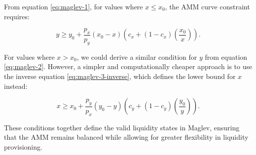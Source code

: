 \documentclass{article}
\begin{document}
From equation \eqref{eq:maglev-1}, for values where \( x \leq x_0 \), the AMM curve constraint requires:

\begin{equation}
    \label{eq:invariant-x1}
    y \geq y_{0}+\frac{p_{x}}{p_{y}}\left(x_{0}-x\right)\left(c_{x}+\left(1-c_{x}\right)\left(\frac{x_{0}}{x}\right)\right).
\end{equation}

For values where \( x > x_0 \), we could derive a similar condition for $y$ from equation \eqref{eq:maglev-2}. However, a simpler and computationally cheaper approach is to use the inverse equation \eqref{eq:maglev-3-inverse}, which defines the lower bound for $x$ instead:

\begin{equation}
    \label{eq:invariant-x2}
    x \geq x_{0}+\frac{p_{y}}{p_{x}}\left(y_{0}-y\right)\left(c_{y}+\left(1-c_{y}\right)\left(\frac{y_{0}}{y}\right)\right).
\end{equation}

These conditions together define the valid liquidity states in Maglev, ensuring that the AMM remains balanced while allowing for greater flexibility in liquidity provisioning.
\end{document}
